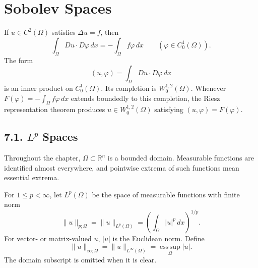 \chapter{Sobolev Spaces}

\begin{remark}
\label{gt:rem-sobolev-weak-poisson}
If $u\in C^2(\Omega)$ satisfies $\Delta u=f$, then
\begin{equation}
\tag{7.1}
\int_\Omega Du\cdot D\varphi\,dx=-\int_\Omega f\varphi\,dx
\qquad(\varphi\in C_0^1(\Omega)).
\end{equation}
The form
\begin{equation}
\tag{7.2}
(u,\varphi)=\int_\Omega Du\cdot D\varphi\,dx
\end{equation}
is an inner product on $C_0^1(\Omega)$. Its completion is
$W_0^{1,2}(\Omega)$. Whenever
$F(\varphi)=-\int_\Omega f\varphi\,dx$ extends boundedly to this completion,
the Riesz representation theorem produces $u\in W_0^{1,2}(\Omega)$ satisfying
$(u,\varphi)=F(\varphi)$.
\end{remark}

\section*{7.1. $L^p$ Spaces}
\label{gt:sec-lp-spaces}

Throughout the chapter, $\Omega\subset\mathbb R^n$ is a bounded domain.
Measurable functions are identified almost everywhere, and pointwise extrema
of such functions mean essential extrema.

\begin{definition}[$L^p$ spaces]
\label{gt:def-sobolev-lp-spaces}
For $1\leq p<\infty$, let $L^p(\Omega)$ be the space of measurable functions
with finite norm
\begin{equation}
\tag{7.3}
\|u\|_{p;\Omega}=\|u\|_{L^p(\Omega)}
=\left(\int_\Omega |u|^p\,dx\right)^{1/p}.
\end{equation}
For vector- or matrix-valued $u$, $|u|$ is the Euclidean norm. Define
\begin{equation}
\tag{7.4}
\|u\|_{\infty;\Omega}=\|u\|_{L^\infty(\Omega)}
=\operatorname*{ess\,sup}_\Omega |u|.
\end{equation}
The domain subscript is omitted when it is clear.
\end{definition}

